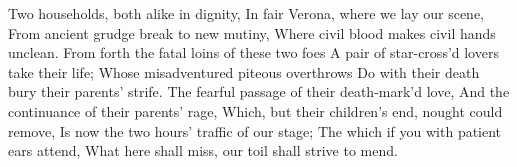 \begin{speech}
Two households, both alike in dignity,
          In fair Verona, where we lay our scene,
          From ancient grudge break to new mutiny,
          Where civil blood makes civil hands unclean.
          From forth the fatal loins of these two foes
          A pair of star-cross'd lovers take their life;
          Whose misadventured piteous overthrows
          Do with their death bury their parents' strife.
          The fearful passage of their death-mark'd love,
          And the continuance of their parents' rage,
          Which, but their children's end, nought could remove,
          Is now the two hours' traffic of our stage;
          The which if you with patient ears attend,
          What here shall miss, our toil shall strive to mend.
\end{speech}




